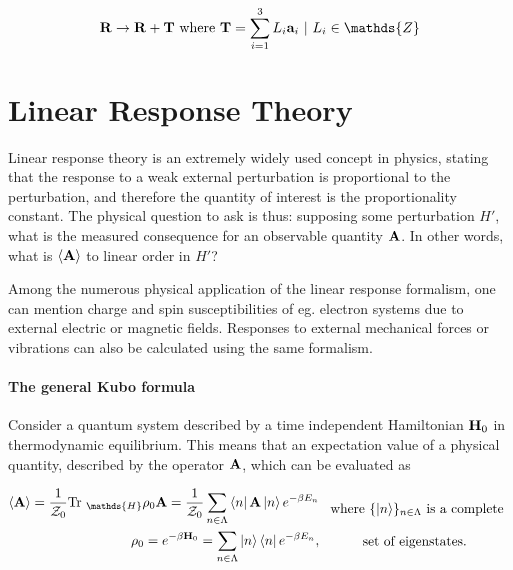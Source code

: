 \documentclass{homework}
\begin{document}
$$
\Rb \rightarrow \Rb + {\bf T} \textnormal{ where } {\bf T} = \sum_{i=1}^{3} L_i {\bf a}_i \blanky | \blanky L_i \in \mathds{Z}
$$

\clearpage

\section{Linear Response Theory}

Linear response theory is an extremely widely used concept in physics, stating that the response to a weak external perturbation is proportional to the perturbation, and therefore the quantity of interest is the proportionality constant. The physical question to ask is thus: supposing some perturbation $H'$, what is the measured consequence for an observable quantity ${\bf A}$. In other words, what is $\langle {\bf A} \rangle$ to linear order in $H'$? 

Among the numerous physical application of the linear response formalism, one can mention charge and spin susceptibilities of eg. electron systems due to external electric or magnetic fields. Responses to external mechanical forces or vibrations can also be calculated using the same formalism. \\

\paragraph{\textbf{The general Kubo formula}}

Consider a quantum system described by a time independent Hamiltonian ${\bf H}_0$ in thermodynamic equilibrium. This means that an expectation value of a physical quantity, described by the operator ${\bf A}$, which can be evaluated as 

\begin{equation}
    \begin{split}
        \langle {\bf A} \rangle = \frac{1}{\mathcal{Z}_0} \textnormal{Tr }_{\mathds{H}} \rho_0 {\bf A}  = \frac{1}{\mathcal{Z}_0} \sum_{n \in \Lambda} \bra{n} {{\bf A}} \ket{n} e^{-\beta E_n} \\
        \rho_0 = e^{-\beta {\bf H}_0} = \sum_{n \in \Lambda} \ket{n} \bra{n} e^{-\beta E_n},
    \end{split} \begin{array}{c}
         \textnormal{ where $\{\ket{n}\}_{n \in \Lambda}$ is a complete} \\
         \\
         \textnormal{set of eigenstates}.
    \end{array}
\end{equation}
\end{document}
